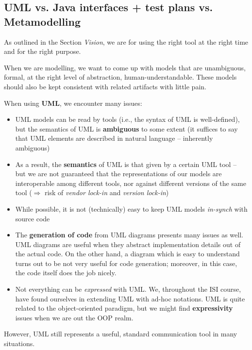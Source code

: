 \documentclass[11pt]{article}
\begin{document}
\subsection{UML vs. Java interfaces + test plans vs.
Metamodelling}

As outlined in the Section \emph{Vision}, we are for using the right tool at the
right time and for the right purpose.

When we are modelling, we want to come up with models that are unambiguous,
formal, at the right level of abstraction, human-understandable. These models 
 should also be kept consistent with related artifacts with little pain.

When using \textbf{UML}, we encounter many issues:

\begin{itemize}
  \item UML models can be read by tools (i.e., the syntax of UML is
    well-defined), but the semantics of UML is \textbf{ambiguous} to some
    extent (it suffices to say that UML elements are described in natural language -- inherently ambiguous)
  \item As a result, the \textbf{semantics} of UML is that given by a certain
  UML tool -- but we are not guaranteed that the representations of our models are
    interoperable among different tools, nor against different versions of the
    same tool ($\Rightarrow$ risk of \emph{vendor lock-in} and \emph{version
    lock-in})
  \item While possible, it is not (technically) easy to keep UML models
  \emph{in-synch} with source code
  \item The \textbf{generation of code} from UML diagrams presents many issues
  as well.
  UML diagrams are useful when they abstract implementation details out of the
  actual code. On the other hand, a diagram which is easy to understand turns
  out to be not very useful for code generation; moreover, in this case, the
  code itself does the job nicely.
  \item Not everything can be \emph{expressed} with UML. We, throughout the ISI
  course, have found ourselves in extending UML with ad-hoc notations.
  UML is quite related to the object-oriented paradigm, but we might find 
  \textbf{expressivity} issues when we are out the OOP realm.  
\end{itemize}

However, UML still represents a useful, standard communication tool in many
situations. \\
\end{document}
